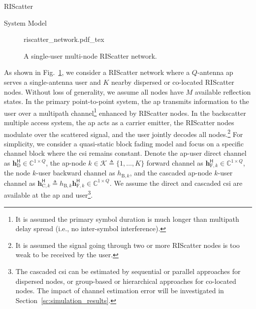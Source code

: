 \documentclass[journal]{IEEEtran}
\begin{document}
\begin{section}{RIScatter}
	\begin{subsection}{System Model}
		\label{sc:system_model}
		\begin{figure}[!t]
			\centering
			\def\svgwidth{0.7\columnwidth}
			\footnotesize{
				{riscatter_network.pdf_tex}
			}
			\caption{A single-user multi-node RIScatter network.}
			\label{fg:riscatter_network}
		\end{figure}
		As shown in Fig.~\ref{fg:riscatter_network}, we consider a RIScatter network where a $Q$-antenna \gls{ap} serves a single-antenna user and $K$ nearby dispersed or co-located RIScatter nodes.
		Without loss of generality, we assume all nodes have $M$ available reflection states.
		In the primary point-to-point system, the \gls{ap} transmits information to the user over a multipath channel\footnote{It is assumed the primary symbol duration is much longer than multipath delay spread (i.e., no inter-symbol interference).} enhanced by RIScatter nodes.
		In the backscatter multiple access system, the \gls{ap} acts as a carrier emitter, the RIScatter nodes modulate over the scattered signal, and the user jointly decodes all nodes.\footnote{It is assumed the signal going through two or more RIScatter nodes is too weak to be received by the user.}
		For simplicity, we consider a quasi-static block fading model and focus on a specific channel block where the \gls{csi} remains constant.
		Denote the \gls{ap}-user direct channel as $\boldsymbol{h}_{\text{D}}^\mathsf{H} \in \mathbb{C}^{1 \times Q}$, the \gls{ap}-node $k \in \mathcal{K} \triangleq \{1,\ldots,K\}$ forward channel as $\boldsymbol{h}_{\text{F},k}^\mathsf{H} \in \mathbb{C}^{1 \times Q}$, the node $k$-user backward channel as $h_{\text{B},k}$, and the cascaded \gls{ap}-node $k$-user channel as $\boldsymbol{h}_{\text{C},k}^\mathsf{H} \triangleq h_{\text{B},k} \boldsymbol{h}_{\text{F},k}^\mathsf{H} \in \mathbb{C}^{1 \times Q}$.
		We assume the direct and cascaded \gls{csi} are available at the \gls{ap} and user\footnote{The cascaded \gls{csi} can be estimated by sequential \cite{Bharadia2015,Yang2015b,Guo2019g} or parallel \cite{Jin2021a} approaches for dispersed nodes, or group-based \cite{Zheng2019} or hierarchical \cite{You2019} approaches for co-located nodes. The impact of channel estimation error will be investigated in Section~\ref{sc:simulation_results}.}.


\end{subsection}
\end{section}
\end{document}
